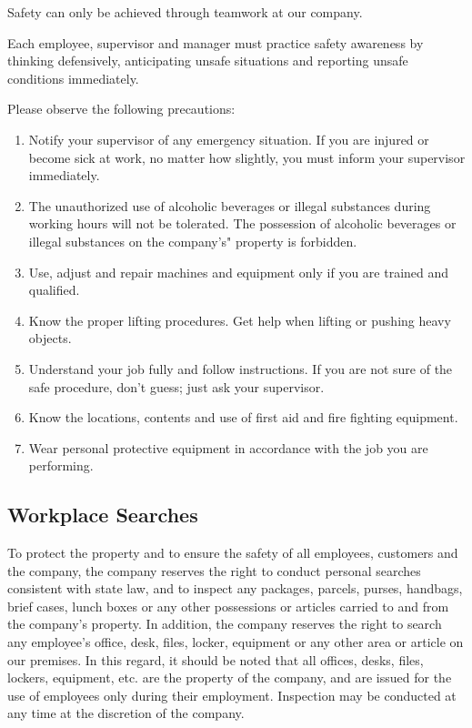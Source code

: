 Safety can only be achieved through teamwork at our company.

Each employee, supervisor and manager must practice safety awareness by thinking defensively, anticipating unsafe situations and reporting unsafe conditions immediately.

Please observe the following precautions:

\begin{enumerate}
		
	\item Notify your supervisor of any emergency 	situation. If you are injured or become sick at 	work, no matter how slightly, you must inform 	your supervisor immediately.
	
	\item The unauthorized use of alcoholic beverages or 	illegal substances during working hours will not 	be tolerated. The possession of alcoholic 	beverages or illegal substances on the 	company's" property is forbidden.
	
	\item Use, adjust and repair machines and equipment 	only if you are trained and qualified.
	
	\item Know the proper lifting procedures. Get help 	when lifting or pushing heavy objects.
	
	\item Understand your job fully and follow instructions. 	If you are not sure of the safe procedure, don't 	guess; just ask your supervisor.
	
	\item Know the locations, contents and use of first aid 	and fire fighting equipment.
	
	\item Wear personal protective equipment in 	accordance with the job you are performing.

\end{enumerate}
	
\subsection{Workplace Searches}

To protect the property and to ensure the safety of all employees, customers and the company, the company reserves the right to conduct personal searches consistent with state law, and to inspect any packages, parcels, purses, handbags, brief cases, lunch boxes or any other possessions or articles carried to and from the company's property. In addition, the company reserves the right to search any employee's office, desk, files, locker, equipment or any other area or article on our premises. In this regard, it should be noted that all offices, desks, files, lockers, equipment, etc. are the property of the company, and are issued for the use of employees only during their employment. Inspection may be conducted at any time at the discretion of the company.


